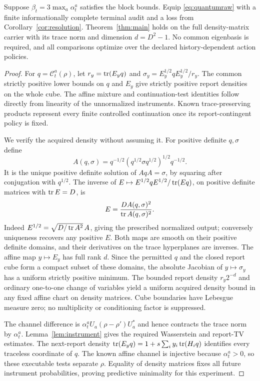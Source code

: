 \begin{theorem}\label{thm:quantum}
Suppose $\beta_t=3\max_a\alpha_t^a$ satisfies the block bounds. Equip \eqref{eq:quantumraw} with a finite informationally complete terminal audit and a loss from Corollary~\ref{cor:resolution}. Theorem~\ref{thm:main} holds on the full density-matrix carrier with its trace norm and dimension $d=D^2-1$. No common eigenbasis is required, and all comparisons optimize over the declared history-dependent action policies.
\end{theorem}
\begin{proof}
For $q=\mathcal C_t^a(\rho)$, let $r_y=\operatorname{tr}(E_yq)$ and $\sigma_y=E_y^{1/2}qE_y^{1/2}/r_y$. The common strictly positive lower bounds on $q$ and $E_y$ give strictly positive report densities on the whole cube. The affine mixture and continuation-test identities follow directly from linearity of the unnormalized instruments. Known trace-preserving products represent every finite controlled continuation once its report-contingent policy is fixed.

We verify the acquired density without assuming it. For positive definite $q,\sigma$ define
\[
 A(q,\sigma)=q^{-1/2}(q^{1/2}\sigma q^{1/2})^{1/2}q^{-1/2}.
\]
It is the unique positive definite solution of $AqA=\sigma$, by squaring after conjugation with $q^{1/2}$. The inverse of $E\mapsto E^{1/2}qE^{1/2}/\operatorname{tr}(Eq)$, on positive definite matrices with $\operatorname{tr} E=D$, is
\begin{equation}\label{eq:quantuminverse}
 E=\frac{D A(q,\sigma)^2}{\operatorname{tr} A(q,\sigma)^2}.
\end{equation}
Indeed $E^{1/2}=\sqrt{D/\operatorname{tr} A^2}\,A$, giving the prescribed normalized output; conversely uniqueness recovers any positive $E$. Both maps are smooth on their positive definite domains, and their derivatives on the trace hyperplanes are inverses. The affine map $y\mapsto E_y$ has full rank $d$. Since the permitted $q$ and the closed report cube form a compact subset of these domains, the absolute Jacobian of $y\mapsto\sigma_y$ has a uniform strictly positive minimum. The bounded report density $r_y2^{-d}$ and ordinary one-to-one change of variables yield a uniform acquired density bound in any fixed affine chart on density matrices. Cube boundaries have Lebesgue measure zero; no multiplicity or conditioning factor is suppressed.

The channel difference is $\alpha_t^aU_a(\rho-\rho')U_a^*$ and hence contracts the trace norm by $\alpha_t^a$. Lemma~\ref{lem:instrument} gives the required Wasserstein and report-TV estimates. The next-report density $\operatorname{tr}(E_yq)=1+s\sum_i y_i\operatorname{tr}(H_iq)$ identifies every traceless coordinate of $q$. The known affine channel is injective because $\alpha_t^a>0$, so these executable tests separate $\rho$. Equality of density matrices fixes all future instrument probabilities, proving predictive minimality for this experiment.


\end{proof}
